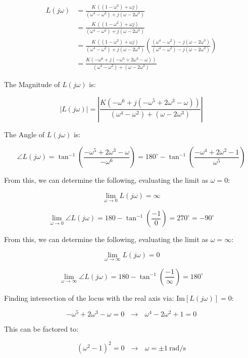 \documentclass[12pt, letterpaper]{../assignment}
\begin{document}
\begin{equation*}
    \begin{aligned}
    L(j\omega) &= \frac{K\,\left((1-\omega ^2)+\omega j\right)}{(\omega ^4-\omega ^2)+j(\omega- 2\omega ^3)} \\
    &=  \frac{K\,\left((1-\omega ^2)+\omega j\right)}{(\omega ^4-\omega ^2)+j(\omega- 2\omega ^3)} \\
    &=  \frac{K\,\left((1-\omega ^2)+\omega j\right)}{(\omega ^4-\omega ^2)+j(\omega- 2\omega ^3)}
    \left(\frac{(\omega ^4-\omega ^2)-j(\omega- 2\omega ^3)}{(\omega ^4-\omega ^2)-j(\omega- 2\omega ^3)}\right) \\
    &=  \frac{K\left(-\omega ^6+ j(-\omega ^5 +2 \omega ^3 -\omega  )\right)}{(\omega ^4-\omega ^2)+(\omega- 2\omega ^3)}
    \end{aligned}
\end{equation*}

The Magnitude of $L(j\omega)$ is:

$$ |L(j\omega)| = \left|\frac{K\left(-\omega ^6+ j(-\omega ^5 +2 \omega ^3 -\omega  )\right)}{(\omega ^4-\omega ^2)+(\omega- 2\omega ^3)} \right| $$

The Angle of $L(j\omega)$ is:

$$ \angle L(j\omega) = \tan^{-1}\left( \frac{-\omega ^5 +2 \omega ^3 -\omega  }{-\omega ^6}\right) = 180^\circ - \tan^{-1} \left(\frac{-\omega ^4 +2 \omega ^2 - 1 }{\omega ^5}\right) $$

From this, we can determine the following, evaluating the limit as $\omega = 0$:

$$ \lim_{\omega \to 0} L(j\omega) = \infty   $$

$$ \lim_{\omega \to 0} \angle L(j\omega) = 180 -\tan^{-1}\left(\frac{-1}{0}\right) = 270^\circ = -90^\circ $$

From this, we can determine the following, evaluating the limit as $\omega = \infty$:

$$ \lim_{\omega \to \infty} L(j\omega) = 0   $$

$$ \lim_{\omega \to \infty} \angle L(j\omega) = 180 -\tan^{-1}\left(\frac{-1}{\infty}\right) = 180^\circ $$

Finding intersection of the locus with the real axis via: $\text{Im}[L(j\omega)]=0$:

$$ -\omega ^5 +2 \omega ^3 -\omega = 0 \ \ \ \rightarrow \ \ \ \omega ^4 -2 \omega ^2 +1 = 0 $$

This can be factored to:

$$ (\omega ^2 - 1)^2 = 0 \ \ \ \rightarrow \ \ \ \omega = \pm 1\ \text{rad/s}$$
\end{document}

